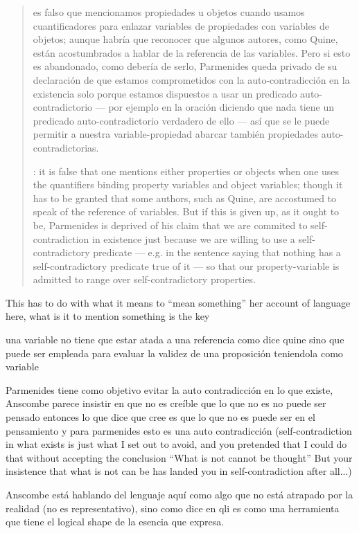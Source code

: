 \blockquote[{\cite[5]{anscombe1981parmenides:pmc}}: it is false that one mentions either properties or objects when one uses the quantifiers binding property variables and object variables; though it has to be granted that some authors, such as Quine, are accostumed to speak of the reference of variables. But if this is given up, as it ought to be, Parmenides is deprived of his claim that we are commited to self-contradiction in existence just because we are willing to use a self-contradictory predicate --- e.g. in the sentence saying that nothing has a self-contradictory predicate true of it --- so that our property-variable is admitted to range over self-contradictory properties.]{es falso que mencionamos propiedades u objetos cuando usamos cuantificadores para enlazar variables de propiedades con variables de objetos; aunque habría que reconocer que algunos autores, como Quine, están acostumbrados a hablar de la referencia de las variables. Pero si esto es abandonado, como debería de serlo, Parmenides queda privado de su declaración de que estamos comprometidos con la auto-contradicción en la existencia solo porque estamos dispuestos a usar un predicado auto-contradictorio --- por ejemplo en la oración diciendo que nada tiene un predicado auto-contradictorio verdadero de ello --- así que se le puede permitir a nuestra variable-propiedad abarcar también propiedades auto-contradictorias.}

This has to do with what it means to ``mean something''
her account of language here, what is it to mention something is the key

una variable no tiene que estar atada a una referencia como dice quine sino que puede ser empleada para evaluar la validez de una proposición teniendola como variable

Parmenides tiene como objetivo evitar la auto contradicción en lo que existe, Anscombe parece insistir en que no es creíble que lo que no es no puede ser pensado entonces lo que dice que cree es que lo que no es puede ser en el pensamiento y para parmenides esto es una auto contradicción (self-contradiction in what exists is just what I set out to avoid, and you pretended that I could do that without accepting the conclusion ``What is not cannot be thought'' But your insistence that what is not can be has landed you in self-contradiction after all...)

Anscombe está hablando del lenguaje aquí como algo que no está atrapado por la realidad (no es representativo), sino como dice en qli es como una herramienta que tiene el logical shape de la esencia que expresa.

